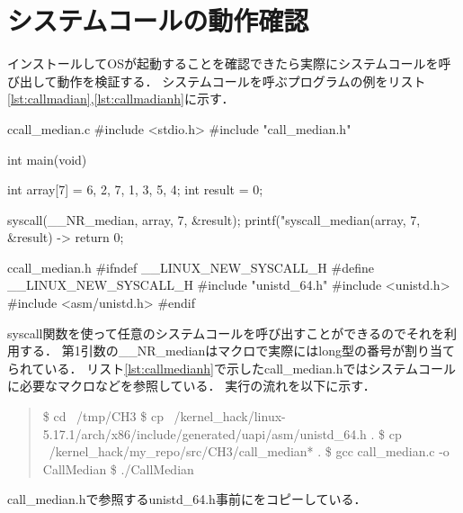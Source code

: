 \section{システムコールの動作確認}
インストールしてOSが起動することを確認できたら実際にシステムコールを呼び出して動作を検証する．
システムコールを呼ぶプログラムの例をリスト\ref{lst:callmadian},\ref{lst:callmadianh}に示す．
\begin{longlisting}
\begin{myminted}{c}{call\_median.c}
#include <stdio.h>
#include "call_median.h"

int main(void) {
    int array[7] = {6, 2, 7, 1, 3, 5, 4};
    int result = 0;

    syscall(__NR_median, array, 7, &result);
    printf("syscall_median(array, 7, &result) -> %
    return 0;
}
\end{myminted}
\caption{medianを呼ぶプログラム}
\label{lst:callmedian}
\end{longlisting}

\begin{longlisting}
\begin{myminted}{c}{call\_median.h}
#ifndef __LINUX_NEW_SYSCALL_H
#define __LINUX_NEW_SYSCALL_H
#include "unistd_64.h"
#include <unistd.h>
#include <asm/unistd.h>
#endif
\end{myminted}
\caption{call\_median.h}
\label{lst:callmedianh}
\end{longlisting}

syscall関数を使って任意のシステムコールを呼び出すことができるのでそれを利用する．
第1引数の\_\_NR\_medianはマクロで実際にはlong型の番号が割り当てられている．\cite{unistd32}
リスト\ref{lst:callmedianh}で示したcall\_median.hではシステムコールに必要なマクロなどを参照している．
実行の流れを以下に示す．

\begin{quote}
\$ cd ~/tmp/CH3
\$ cp ~/kernel\_hack/linux-5.17.1/arch/x86/include/generated/uapi/asm/unistd\_64.h .
\$ cp ~/kernel\_hack/my\_repo/src/CH3/call\_median* .
\$ gcc call\_median.c -o CallMedian
\$ ./CallMedian
\end{quote}

call\_median.hで参照するunistd\_64.h事前にをコピーしている．


